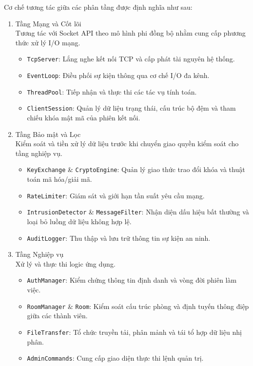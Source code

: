 Cơ chế tương tác giữa các phân tầng được định nghĩa như sau:

\begin{enumerate}
    \item Tầng Mạng và Cốt lõi \\
    Tương tác với Socket API theo mô hình phi đồng bộ nhằm cung cấp phương thức xử lý I/O mạng.
    \begin{itemize}[label={-}]
        \item \texttt{TcpServer}: Lắng nghe kết nối TCP và cấp phát tài nguyên hệ thống.
        \item \texttt{EventLoop}: Điều phối sự kiện thông qua cơ chế I/O đa kênh.
        \item \texttt{ThreadPool}: Tiếp nhận và thực thi các tác vụ tính toán.
        \item \texttt{ClientSession}: Quản lý dữ liệu trạng thái, cấu trúc bộ đệm và tham chiếu khóa mật mã của phiên kết nối.
    \end{itemize}

    \item Tầng Bảo mật và Lọc \\
    Kiểm soát và tiền xử lý dữ liệu trước khi chuyển giao quyền kiểm soát cho tầng nghiệp vụ.
    \begin{itemize}[label={-}]
        \item \texttt{KeyExchange} \& \texttt{CryptoEngine}: Quản lý giao thức trao đổi khóa và thuật toán mã hóa/giải mã.
        \item \texttt{RateLimiter}: Giám sát và giới hạn tần suất yêu cầu mạng.
        \item \texttt{IntrusionDetector} \& \texttt{MessageFilter}: Nhận diện dấu hiệu bất thường và loại bỏ luồng dữ liệu không hợp lệ.
        \item \texttt{AuditLogger}: Thu thập và lưu trữ thông tin sự kiện an ninh.
    \end{itemize}

    \item Tầng Nghiệp vụ \\
    Xử lý và thực thi logic ứng dụng.
    \begin{itemize}[label={-}]
        \item \texttt{AuthManager}: Kiểm chứng thông tin định danh và vòng đời phiên làm việc.
        \item \texttt{RoomManager} \& \texttt{Room}: Kiểm soát cấu trúc phòng và định tuyến thông điệp giữa các thành viên.
        \item \texttt{FileTransfer}: Tổ chức truyền tải, phân mảnh và tái tổ hợp dữ liệu nhị phân.
        \item \texttt{AdminCommands}: Cung cấp giao diện thực thi lệnh quản trị.
    \end{itemize}
\end{enumerate}
